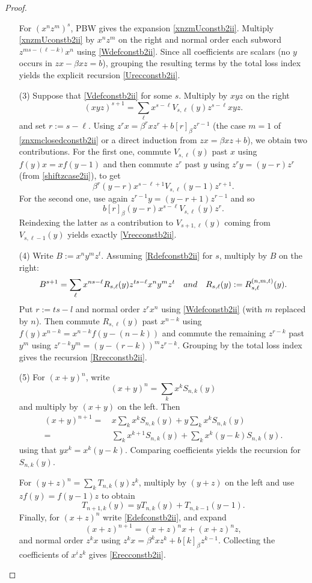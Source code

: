 \documentclass[10pt,a4paper]{amsart}
\begin{document}
\begin{proof}
\begin{enumerate}
For $(x^n z^m)^s$, PBW gives the expansion \eqref{xnzmUconstb2ii}. Multiply \eqref{xnzmUconstb2ii} by $x^n z^m$ on the right and normal order each subword $z^{ms-(\ell-k)}x^n$ using \eqref{Wdefconstb2ii}. Since all coefficients are scalars (no $y$ occurs in $zx - \beta xz = b$), grouping the resulting terms by the total loss index yields the explicit recursion \eqref{Urecconstb2ii}.

\item [\rm (3)] Suppose that \eqref{Vdefconstb2ii} for some $s$. Multiply by $xyz$ on the right
\[
(xyz)^{s+1} = \sum_{\ell} x^{s-\ell}V_{s,\ell}(y)z^{s-\ell}xyz.
\]
and set $r:=s-\ell$. Using $z^{r}x=\beta^{r}x z^{r}+b[r]_\beta z^{r-1}$ (the case $m=1$ of \eqref{znxmclosedconstb2ii} or a direct induction from $zx=\beta xz+b$), we obtain two contributions.
For the first one, commute $V_{s,\ell}(y)$ past $x$ using $f(y)x=x f(y-1)$ and then commute $z^r$ past $y$ using
$z^r y=(y-r)z^r$ (from \eqref{shiftzcase2ii}), to get
\[
\beta^{r}(y-r)  x^{s-\ell+1}V_{s,\ell}(y-1)z^{r+1}.
\]
For the second one, use again $z^{r-1}y=(y-r+1)z^{r-1}$ and so 
\[
b[r]_\beta (y-r)x^{s-\ell}V_{s,\ell}(y)z^{r}.
\]
Reindexing the latter as a contribution to $V_{s+1,\ell}(y)$ coming from $V_{s,\ell-1}(y)$ yields exactly \eqref{Vrecconstb2ii}.

\item [\rm (4)] Write $B:=x^n y^m z^t$. Assuming \eqref{Rdefconstb2ii} for $s$, multiply by $B$ on the right:
\[
B^{s+1}=\sum_{\ell} x^{ns-\ell}R_{s,\ell}(y)  z^{ts-\ell}x^n y^m z^t 
\quad {\rm and} \quad R_{s,\ell}(y):=R^{(n,m,t)}_{s,\ell}(y).
\]
Put $r := ts - l$ and normal order $z^{r}x^n$ using \eqref{Wdefconstb2ii} (with $m$ replaced by $n$). Then commute $R_{s,\ell}(y)$ past $x^{n-k}$ using $f(y)x^{n-k}=x^{n-k}f(y-(n-k))$ and commute the remaining
$z^{r-k}$ past $y^m$ using $z^{r-k}y^m=(y-(r-k))^m z^{r-k}$. Grouping by the total loss index gives the recursion \eqref{Rrecconstb2ii}.

\item [\rm (5)] For $(x+y)^n$, write
$$
(x+y)^n = \sum_k x^k S_{n,k}(y)
$$ 
and multiply by $(x+y)$ on the left. Then
\begin{align*}
(x+y)^{n+1} = &\, x\sum_k x^k S_{n,k}(y)+y\sum_k x^k S_{n,k}(y) \\
= &\, \sum_k x^{k+1}S_{n,k}(y)+\sum_k x^k (y-k)S_{n,k}(y).
\end{align*}
using that $yx^k = x^k(y-k)$. Comparing coefficients yields the recursion for $S_{n,k}(y)$. 

For $(y+z)^n = \sum_k T_{n,k}(y)z^k$, multiply by $(y+z)$ on the left and use $z f(y)=f(y-1)z$ to obtain 
$$
T_{n+1,k}(y)=yT_{n,k}(y)+T_{n,k-1}(y-1).
$$
Finally, for $(x+z)^n$ write \eqref{Edefconstb2ii}, and expand
\[
(x+z)^{n+1}=(x+z)^n x+(x+z)^n z,
\]
and normal order $z^k x$ using $z^k x=\beta^k x z^k+b[k]_\beta z^{k-1}$. Collecting the coefficients of $x^i z^k$ gives \eqref{Erecconstb2ii}.
\end{enumerate}
\end{proof}
\end{document}
